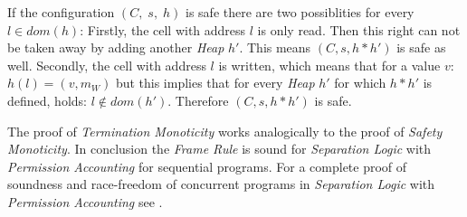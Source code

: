 	\begin{myproof}
		If the configuration $(C,\;s,\;h)$ is safe there are two possiblities for
		every $l\in\textit{dom}(h)$:
		Firstly, the cell with address $l$ is only read. Then this right can not
		be taken away by adding another \emph{Heap} $h'$. This means $(C,s,h\ast h')$
		is safe as well.
		Secondly, the cell with address $l$ is written, which means that for a
		value $v$: $h(l) = (v, m_W)$ but this implies that for every \emph{Heap}
		$h'$ for which $h\ast h'$ is defined, holds: $l \notin\textit{dom}(h')$.
		Therefore $(C,s,h\ast h')$ is safe.
	\end{myproof}
	The proof of \emph{Termination Monoticity} works analogically to the proof
	of \emph{Safety Monoticity}.
	In conclusion the \emph{Frame Rule} is sound for \emph{Separation Logic} with
	\emph{Permission Accounting} for sequential programs.
	For a complete proof of soundness and race-freedom of concurrent programs
	in \emph{Separation Logic} with \emph{Permission Accounting} see \cite{seplogproof}.

